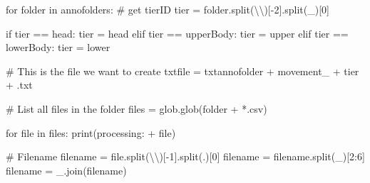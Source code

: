 \documentclass[
  letterpaper,
  DIV=11,
  numbers=noendperiod]{scrreprt}
\newenvironment{Shaded}{\begin{snugshade}}{\end{snugshade}}
\newcommand{\BuiltInTok}[1]{\textcolor[rgb]{0.00,0.23,0.31}{#1}}
\newcommand{\CharTok}[1]{\textcolor[rgb]{0.13,0.47,0.30}{#1}}
\newcommand{\CommentTok}[1]{\textcolor[rgb]{0.37,0.37,0.37}{#1}}
\newcommand{\ControlFlowTok}[1]{\textcolor[rgb]{0.00,0.23,0.31}{#1}}
\newcommand{\DecValTok}[1]{\textcolor[rgb]{0.68,0.00,0.00}{#1}}
\newcommand{\KeywordTok}[1]{\textcolor[rgb]{0.00,0.23,0.31}{#1}}
\newcommand{\NormalTok}[1]{\textcolor[rgb]{0.00,0.23,0.31}{#1}}
\newcommand{\OperatorTok}[1]{\textcolor[rgb]{0.37,0.37,0.37}{#1}}
\newcommand{\StringTok}[1]{\textcolor[rgb]{0.13,0.47,0.30}{#1}}
\begin{document}
\begin{Shaded}
\begin{Highlighting}[]
\ControlFlowTok{for}\NormalTok{ folder }\KeywordTok{in}\NormalTok{ annofolders:}
    \CommentTok{\# get tierID}
\NormalTok{    tier }\OperatorTok{=}\NormalTok{ folder.split(}\StringTok{\textquotesingle{}}\CharTok{\textbackslash{}\textbackslash{}}\StringTok{\textquotesingle{}}\NormalTok{)[}\OperatorTok{{-}}\DecValTok{2}\NormalTok{].split(}\StringTok{\textquotesingle{}\_\textquotesingle{}}\NormalTok{)[}\DecValTok{0}\NormalTok{]}

    \ControlFlowTok{if}\NormalTok{ tier }\OperatorTok{==} \StringTok{\textquotesingle{}head\textquotesingle{}}\NormalTok{:}
\NormalTok{        tier }\OperatorTok{=} \StringTok{\textquotesingle{}head\textquotesingle{}}
    \ControlFlowTok{elif}\NormalTok{ tier }\OperatorTok{==} \StringTok{\textquotesingle{}upperBody\textquotesingle{}}\NormalTok{:}
\NormalTok{        tier }\OperatorTok{=} \StringTok{\textquotesingle{}upper\textquotesingle{}}
    \ControlFlowTok{elif}\NormalTok{ tier }\OperatorTok{==} \StringTok{\textquotesingle{}lowerBody\textquotesingle{}}\NormalTok{:}
\NormalTok{        tier }\OperatorTok{=} \StringTok{\textquotesingle{}lower\textquotesingle{}}

    \CommentTok{\# This is the file we want to create}
\NormalTok{    txtfile }\OperatorTok{=}\NormalTok{ txtannofolder }\OperatorTok{+} \StringTok{\textquotesingle{}movement\_\textquotesingle{}} \OperatorTok{+}\NormalTok{ tier }\OperatorTok{+} \StringTok{\textquotesingle{}.txt\textquotesingle{}}

    \CommentTok{\# List all files in the folder}
\NormalTok{    files }\OperatorTok{=}\NormalTok{ glob.glob(folder }\OperatorTok{+} \StringTok{\textquotesingle{}*.csv\textquotesingle{}}\NormalTok{)}

    \ControlFlowTok{for} \BuiltInTok{file} \KeywordTok{in}\NormalTok{ files:}
        \BuiltInTok{print}\NormalTok{(}\StringTok{\textquotesingle{}processing: \textquotesingle{}} \OperatorTok{+} \BuiltInTok{file}\NormalTok{)}

        \CommentTok{\# Filename}
\NormalTok{        filename }\OperatorTok{=} \BuiltInTok{file}\NormalTok{.split(}\StringTok{\textquotesingle{}}\CharTok{\textbackslash{}\textbackslash{}}\StringTok{\textquotesingle{}}\NormalTok{)[}\OperatorTok{{-}}\DecValTok{1}\NormalTok{].split(}\StringTok{\textquotesingle{}.\textquotesingle{}}\NormalTok{)[}\DecValTok{0}\NormalTok{]}
\NormalTok{        filename }\OperatorTok{=}\NormalTok{ filename.split(}\StringTok{\textquotesingle{}\_\textquotesingle{}}\NormalTok{)[}\DecValTok{2}\NormalTok{:}\DecValTok{6}\NormalTok{]}
\NormalTok{        filename }\OperatorTok{=} \StringTok{\textquotesingle{}\_\textquotesingle{}}\NormalTok{.join(filename)}


\end{Highlighting}
\end{Shaded}
\end{document}
